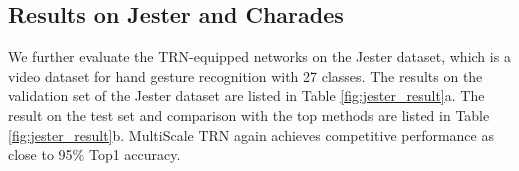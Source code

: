 \documentclass[runningheads]{llncs}
\begin{document}
\begin{table}\vspace{-5mm}
    \centering
    \quad
    \caption{(a) Results on the validation set and test set of the Something-V1 Dataset (Top1 Accuracy) and Something-V2 Dataset (Both Top1 and Top5 accuracy are reported). (b) Comparison of TRN and TSN as the number of frames (fr.) varies on the validation set of the Something-V1. TRN outperforms TSN in a large margin as the number of frames increases, showing the importance of temporal order. }\label{fig:something_result}\vspace{-15mm}
\end{table}





\subsection{Results on Jester and Charades}

We further evaluate the TRN-equipped networks on the Jester dataset, which is a video dataset for hand gesture recognition with 27 classes. The results on the validation set of the Jester dataset are listed in Table \ref{fig:jester_result}a. The result on the test set and comparison with the top methods 
are listed in Table \ref{fig:jester_result}b. MultiScale TRN again achieves competitive performance as close to 95\% Top1 accuracy.
\end{document}
